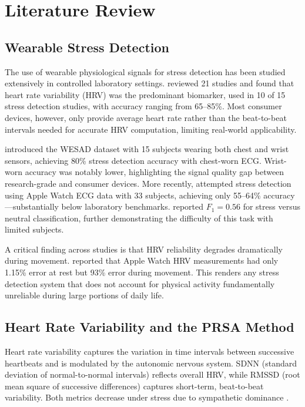 \documentclass[12pt,letterpaper]{article}
\begin{document}
\section{Literature Review}

\subsection{Wearable Stress Detection}

The use of wearable physiological signals for stress detection has been studied extensively in controlled laboratory settings. \cite{hickey2021smart} reviewed 21 studies and found that heart rate variability (HRV) was the predominant biomarker, used in 10 of 15 stress detection studies, with accuracy ranging from 65--85\%. Most consumer devices, however, only provide average heart rate rather than the beat-to-beat intervals needed for accurate HRV computation, limiting real-world applicability.

\cite{schmidt2018wesad} introduced the WESAD dataset with 15 subjects wearing both chest and wrist sensors, achieving 80\% stress detection accuracy with chest-worn ECG. Wrist-worn accuracy was notably lower, highlighting the signal quality gap between research-grade and consumer devices. More recently, \cite{velmovitsky2022smartwatch} attempted stress detection using Apple Watch ECG data with 33 subjects, achieving only 55--64\% accuracy---substantially below laboratory benchmarks. \cite{bahameish2022stress} reported $F_1 = 0.56$ for stress versus neutral classification, further demonstrating the difficulty of this task with limited subjects.

A critical finding across studies is that HRV reliability degrades dramatically during movement. \cite{bonneval2025hrv} reported that Apple Watch HRV measurements had only 1.15\% error at rest but 93\% error during movement. This renders any stress detection system that does not account for physical activity fundamentally unreliable during large portions of daily life.

\subsection{Heart Rate Variability and the PRSA Method}

Heart rate variability captures the variation in time intervals between successive heartbeats and is modulated by the autonomic nervous system. SDNN (standard deviation of normal-to-normal intervals) reflects overall HRV, while RMSSD (root mean square of successive differences) captures short-term, beat-to-beat variability. Both metrics decrease under stress due to sympathetic dominance \citep{hernando2018sdnn}.
\end{document}
